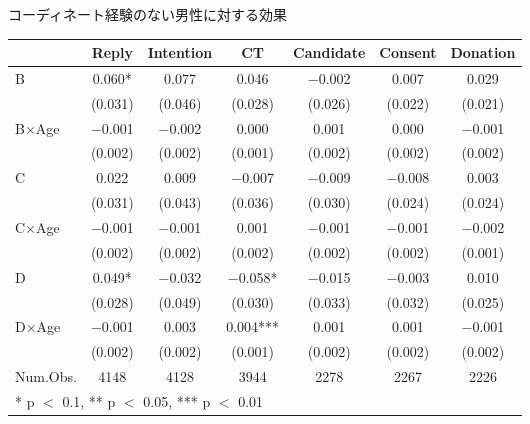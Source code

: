 \documentclass[
      aspectratio=169,
        12pt,
    ]{beamer}
\begin{document}
\begin{frame}{コーディネート経験のない男性に対する効果}
\protect\hypertarget{ux30b3ux30fcux30c7ux30a3ux30cdux30fcux30c8ux7d4cux9a13ux306eux306aux3044ux7537ux6027ux306bux5bfeux3059ux308bux52b9ux679c}{}
\begin{table}
\centering
\fontsize{9}{11}\selectfont
\begin{tabular}[t]{lcccccc}
\toprule
  & Reply & Intention & CT & Candidate & Consent & Donation\\
\midrule
B & \num{0.060}* & \num{0.077} & \num{0.046} & \num{-0.002} & \num{0.007} & \num{0.029}\\
 & (\num{0.031}) & (\num{0.046}) & (\num{0.028}) & (\num{0.026}) & (\num{0.022}) & (\num{0.021})\\
B×Age & \num{-0.001} & \num{-0.002} & \num{0.000} & \num{0.001} & \num{0.000} & \num{-0.001}\\
 & (\num{0.002}) & (\num{0.002}) & (\num{0.001}) & (\num{0.002}) & (\num{0.002}) & \vphantom{1} (\num{0.002})\\
C & \num{0.022} & \num{0.009} & \num{-0.007} & \num{-0.009} & \num{-0.008} & \num{0.003}\\
 & (\num{0.031}) & (\num{0.043}) & (\num{0.036}) & (\num{0.030}) & (\num{0.024}) & (\num{0.024})\\
C×Age & \num{-0.001} & \num{-0.001} & \num{0.001} & \num{-0.001} & \num{-0.001} & \num{-0.002}\\
 & (\num{0.002}) & (\num{0.002}) & (\num{0.002}) & (\num{0.002}) & (\num{0.002}) & (\num{0.001})\\
D & \num{0.049}* & \num{-0.032} & \num{-0.058}* & \num{-0.015} & \num{-0.003} & \num{0.010}\\
 & (\num{0.028}) & (\num{0.049}) & (\num{0.030}) & (\num{0.033}) & (\num{0.032}) & (\num{0.025})\\
D×Age & \num{-0.001} & \num{0.003} & \num{0.004}*** & \num{0.001} & \num{0.001} & \num{-0.001}\\
 & (\num{0.002}) & (\num{0.002}) & (\num{0.001}) & (\num{0.002}) & (\num{0.002}) & (\num{0.002})\\
\midrule
Num.Obs. & \num{4148} & \num{4128} & \num{3944} & \num{2278} & \num{2267} & \num{2226}\\
\bottomrule
\multicolumn{7}{l}{\rule{0pt}{1em}* p $<$ 0.1, ** p $<$ 0.05, *** p $<$ 0.01}\\
\end{tabular}
\end{table}
\end{frame}
\end{document}
